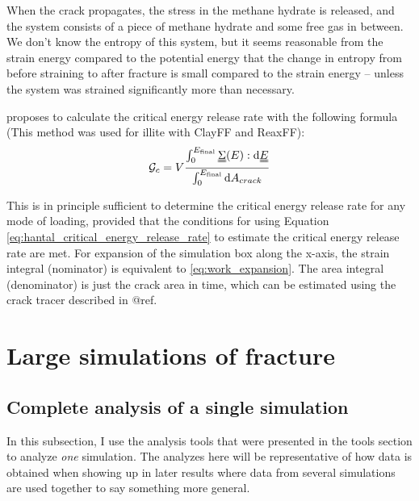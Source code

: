 When the crack propagates, the stress in the methane hydrate is released, and the system consists of a piece of methane hydrate and some free gas in between. We don't know the entropy of this system, but it seems reasonable from the strain energy compared to the potential energy that the change in entropy from before straining to after fracture is small compared to the strain energy -- unless the system was strained significantly more than necessary.


\citet{Hantal2014} proposes to calculate the critical energy release rate with the following formula (This method was used for illite with ClayFF and ReaxFF):
\begin{equation}
	\mathcal{G}_c = V \frac{\int_0^{E_{\text{final}}}\uuline{\Sigma}(E) : \dd \uuline{E}}{\int_0^{E_{\text{final}}} \dd A_{crack}}
	\label{eq:hantal_critical_energy_release_rate}
\end{equation}


This is in principle sufficient to determine the critical energy release rate for any mode of loading, provided that the conditions for using Equation \ref{eq:hantal_critical_energy_release_rate} to estimate the critical energy release rate are met. 
For expansion of the simulation box along the x-axis, the strain integral (nominator) is equivalent to \ref{eq:work_expansion}. The area integral (denominator) is just the crack area in time, which can be estimated using the crack tracer described in @ref. 

\section{Large simulations of fracture}

\subsection{Complete analysis of a single simulation}
In this subsection, I use the analysis tools that were presented in the tools section to analyze \emph{one} simulation. The analyzes here will be representative of how data is obtained when showing up in later results where data from several simulations are used together to say something more general.

